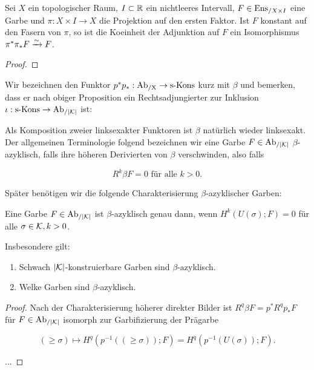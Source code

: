 \begin{lemma}[\cite{TG}, 6.4.17]
  Sei $X$ ein topologischer Raum, $I \subset \mathbb{R}$ ein nichtleeres
  Intervall, $F \in \operatorname{Ens}_{/X \times I}$ eine Garbe und $\pi: X \times
  I \to X$ die Projektion auf den ersten Faktor. Ist $F$ konstant auf
  den Fasern von $\pi$, so ist die Koeinheit der Adjunktion auf $F$
  ein Isomorphismus $\pi^* \pi_* F \xrightarrow{\sim} F$.
\end{lemma}
\begin{proof}
  
\end{proof}

Wir bezeichnen den Funktor $p^*p_*: \operatorname{Ab_{/X}} \to \operatorname{s-Kons}$ kurz mit $\beta$
und bemerken, dass er nach obiger Proposition ein Rechtsadjungierter
zur Inklusion $\iota: \operatorname{s-Kons} \to \operatorname{Ab}_{/|\mathcal{K}|}$ ist:


Als Komposition zweier linksexakter Funktoren ist $\beta$ natürlich
wieder linksexakt. Der allgemeinen Terminologie folgend bezeichnen wir
eine Garbe $F \in \operatorname{Ab}_{/|\mathcal{K}|}$ $\beta$-azyklisch, falls ihre höheren
Derivierten von $\beta$ verschwinden, also falls

\[ R^k\beta F = 0 \text{ für alle } k > 0.  \]

Später benötigen wir die folgende Charakterisierung
$\beta$-azyklischer Garben:

\begin{prop} \label{sk-ist-azyk}
  Eine Garbe $F \in \operatorname{Ab}_{/|\mathcal{K}|}$ ist $\beta$-azyklisch genau dann, wenn
  $H^k(U(\sigma); F) = 0$ für alle $\sigma \in \mathcal{K}, k >
  0$.

  Insbesondere gilt:
  \begin{enumerate}
  \item Schwach $|\mathcal{K}|$-konstruierbare Garben sind $\beta$-azyklisch.
  \item Welke Garben sind $\beta$-azyklisch.
  \end{enumerate}  
\end{prop}
\begin{proof}
  Nach der Charakterisierung höherer direkter Bilder ist $R^q \beta F
  = p^* R^q p_* F$ für $F \in \operatorname{Ab}_{/|\mathcal{K}|}$ isomorph zur Garbifizierung der
  Prägarbe

  \[ (\geq \sigma) \mapsto H^q(p^{-1}((\geq \sigma)); F) = H^q(p^{-1}(U(\sigma)); F). \]

  ...
\end{proof}


